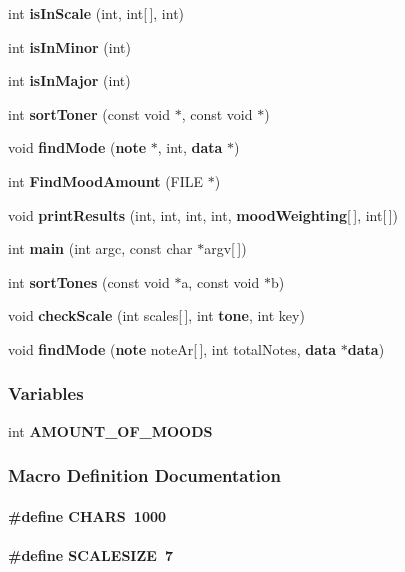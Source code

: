 \begin{DoxyCompactItemize}
\item 
int {\bf is\+In\+Scale} (int, int[$\,$], int)
\item 
int {\bf is\+In\+Minor} (int)
\item 
int {\bf is\+In\+Major} (int)
\item 
int {\bf sort\+Toner} (const void $\ast$, const void $\ast$)
\item 
void {\bf find\+Mode} ({\bf note} $\ast$, int, {\bf data} $\ast$)
\item 
int {\bf Find\+Mood\+Amount} (F\+I\+L\+E $\ast$)
\item 
void {\bf print\+Results} (int, int, int, int, {\bf mood\+Weighting}[$\,$], int[$\,$])
\item 
int {\bf main} (int argc, const char $\ast$argv[$\,$])
\item 
int {\bf sort\+Tones} (const void $\ast$a, const void $\ast$b)
\item 
void {\bf check\+Scale} (int scales[$\,$], int {\bf tone}, int key)
\item 
void {\bf find\+Mode} ({\bf note} note\+Ar[$\,$], int total\+Notes, {\bf data} $\ast${\bf data})
\end{DoxyCompactItemize}
\subsubsection*{Variables}
\begin{DoxyCompactItemize}
\item 
int {\bf A\+M\+O\+U\+N\+T\+\_\+\+O\+F\+\_\+\+M\+O\+O\+D\+S}
\end{DoxyCompactItemize}


\subsubsection{Macro Definition Documentation}
\paragraph[{C\+H\+A\+R\+S}]{\setlength{\rightskip}{0pt plus 5cm}\#define C\+H\+A\+R\+S~1000}\label{main_8c_a5d7cfaaf3d71eb89b31364adb9fda6a6}
\paragraph[{S\+C\+A\+L\+E\+S\+I\+Z\+E}]{\setlength{\rightskip}{0pt plus 5cm}\#define S\+C\+A\+L\+E\+S\+I\+Z\+E~7}\label{main_8c_a3c7b5c7d1b09d118aa63ec87e3c73a8b}


